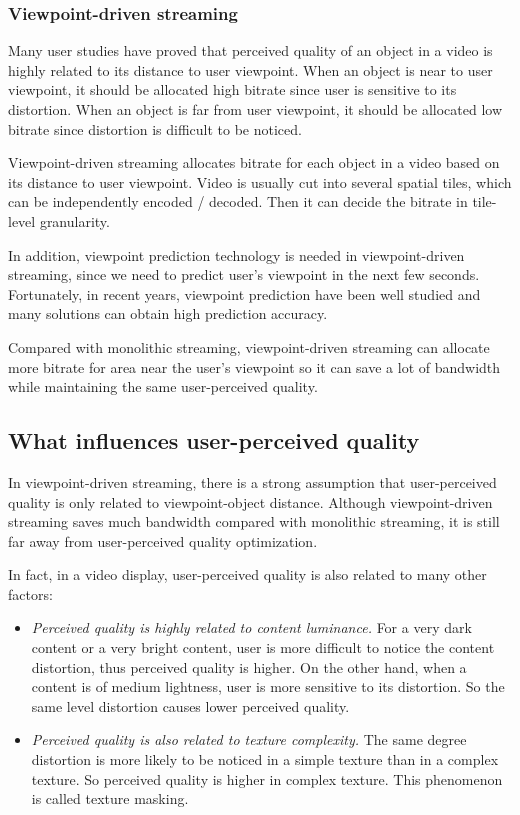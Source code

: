 \subsubsection{Viewpoint-driven streaming}
Many user studies have proved that perceived quality of an object in a video is highly related to its distance to user viewpoint. When an object is near to user viewpoint, it should be allocated high bitrate since user is sensitive to its distortion. When an object is far from user viewpoint, it should be allocated low bitrate since distortion is difficult to be noticed.

Viewpoint-driven streaming allocates bitrate for each object in a video based on its distance to user viewpoint. Video is usually cut into several spatial tiles, which can be independently encoded / decoded. Then it can decide the bitrate in tile-level granularity.

In addition, viewpoint prediction technology is needed in viewpoint-driven streaming, since we need to predict user's viewpoint in the next few seconds. Fortunately, in recent years, viewpoint prediction have been well studied and many solutions can obtain high prediction accuracy.

Compared with monolithic streaming, viewpoint-driven streaming can allocate more bitrate for area near the user's viewpoint so it can save a lot of bandwidth while maintaining the same user-perceived quality.

\subsection{What influences user-perceived quality}
In viewpoint-driven streaming, there is a strong assumption that user-perceived quality is only related to viewpoint-object distance. Although viewpoint-driven streaming saves much bandwidth compared with monolithic streaming, it is still far away from user-perceived quality optimization.

In fact, in a video display, user-perceived quality is also related to many other factors:

\begin{itemize}

\item \emph{Perceived quality is highly related to content luminance.} For a very dark content or a very bright content, user is more difficult to notice the content distortion, thus perceived quality is higher. On the other hand, when a content is of medium lightness, user is more sensitive to its distortion. So the same level distortion causes lower perceived quality.

\item \emph{Perceived quality is also related to texture complexity.} The same degree distortion is more likely to be noticed in a simple texture than in a complex texture. So perceived quality is higher in complex texture. This phenomenon is called texture masking.

\end{itemize}

